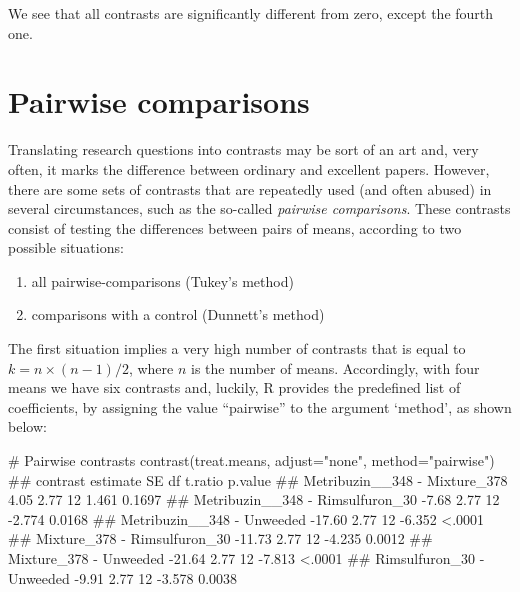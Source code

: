 \documentclass[a4paper,12pt,oneside]{book}
\providecommand{\tightlist}{%
  \setlength{\itemsep}{0pt}\setlength{\parskip}{0pt}}
\newenvironment{Shaded}{\begin{snugshade}}{\end{snugshade}}
\newcommand{\StringTok}[1]{#1}
\newcommand{\CommentTok}[1]{#1}
\newcommand{\DocumentationTok}[1]{#1}
\newcommand{\FunctionTok}[1]{#1}
\newcommand{\AttributeTok}[1]{#1}
\newcommand{\NormalTok}[1]{#1}
\begin{document}
\normalsize

We see that all contrasts are significantly different from zero, except the fourth one.

\hypertarget{pairwise-comparisons}{%
\section{Pairwise comparisons}\label{pairwise-comparisons}}

Translating research questions into contrasts may be sort of an art and, very often, it marks the difference between ordinary and excellent papers. However, there are some sets of contrasts that are repeatedly used (and often abused) in several circumstances, such as the so-called \emph{pairwise comparisons}. These contrasts consist of testing the differences between pairs of means, according to two possible situations:

\begin{enumerate}
\def\labelenumi{\arabic{enumi}.}
\tightlist
\item
  all pairwise-comparisons (Tukey's method)
\item
  comparisons with a control (Dunnett's method)
\end{enumerate}

The first situation implies a very high number of contrasts that is equal to \(k = n \times (n - 1) /2\), where \(n\) is the number of means. Accordingly, with four means we have six contrasts and, luckily, R provides the predefined list of coefficients, by assigning the value ``pairwise'' to the argument `method', as shown below:

\footnotesize

\begin{Shaded}
\begin{Highlighting}[]
\CommentTok{\# Pairwise contrasts}
\FunctionTok{contrast}\NormalTok{(treat.means, }\AttributeTok{adjust=}\StringTok{"none"}\NormalTok{, }\AttributeTok{method=}\StringTok{"pairwise"}\NormalTok{)}
\DocumentationTok{\#\#  contrast                         estimate   SE df t.ratio p.value}
\DocumentationTok{\#\#  Metribuzin\_\_348 {-} Mixture\_378        4.05 2.77 12   1.461  0.1697}
\DocumentationTok{\#\#  Metribuzin\_\_348 {-} Rimsulfuron\_30    {-}7.68 2.77 12  {-}2.774  0.0168}
\DocumentationTok{\#\#  Metribuzin\_\_348 {-} Unweeded         {-}17.60 2.77 12  {-}6.352  \textless{}.0001}
\DocumentationTok{\#\#  Mixture\_378 {-} Rimsulfuron\_30       {-}11.73 2.77 12  {-}4.235  0.0012}
\DocumentationTok{\#\#  Mixture\_378 {-} Unweeded             {-}21.64 2.77 12  {-}7.813  \textless{}.0001}
\DocumentationTok{\#\#  Rimsulfuron\_30 {-} Unweeded           {-}9.91 2.77 12  {-}3.578  0.0038}
\end{Highlighting}
\end{Shaded}
\end{document}
